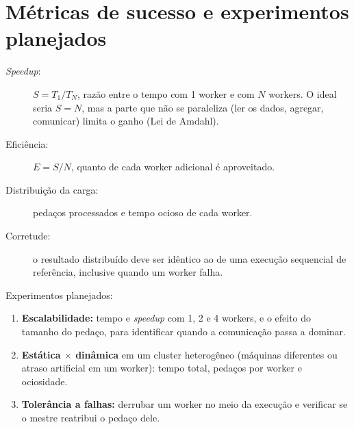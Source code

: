 \section{Métricas de sucesso e experimentos planejados}
\label{sec:metricas}

\begin{description}
  \item[\emph{Speedup}:] $S = T_1 / T_N$, razão entre o tempo com 1 worker
    e com $N$ workers. O ideal seria $S = N$, mas a parte que não se
    paraleliza (ler os dados, agregar, comunicar) limita o ganho (Lei de
    Amdahl).
  \item[Eficiência:] $E = S / N$, quanto de cada worker adicional é
    aproveitado.
  \item[Distribuição da carga:] pedaços processados e tempo ocioso de
    cada worker.
  \item[Corretude:] o resultado distribuído deve ser idêntico ao de uma
    execução sequencial de referência, inclusive quando um worker falha.
\end{description}

Experimentos planejados:

\begin{enumerate}
  \item \textbf{Escalabilidade:} tempo e \emph{speedup} com 1, 2 e 4
    workers, e o efeito do tamanho do pedaço, para identificar quando a
    comunicação passa a dominar.
  \item \textbf{Estática $\times$ dinâmica} em um cluster heterogêneo
    (máquinas diferentes ou atraso artificial em um worker): tempo total,
    pedaços por worker e ociosidade.
  \item \textbf{Tolerância a falhas:} derrubar um worker no meio da
    execução e verificar se o mestre reatribui o pedaço dele.
\end{enumerate}

